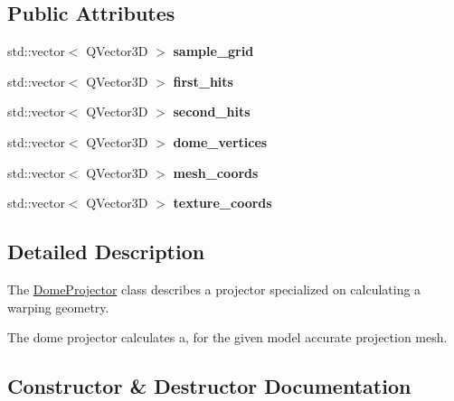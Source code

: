 \subsection*{Public Attributes}
\begin{DoxyCompactItemize}
\item 
\mbox{\label{class_dome_projector_aee69ea0cbe641217af998cbb6669d91a}} 
std\+::vector$<$ Q\+Vector3D $>$ {\bfseries sample\+\_\+grid}
\item 
\mbox{\label{class_dome_projector_a5d157d37386f714b94dd04455019749b}} 
std\+::vector$<$ Q\+Vector3D $>$ {\bfseries first\+\_\+hits}
\item 
\mbox{\label{class_dome_projector_aec6c5285b17e5c73537c45eb62bada81}} 
std\+::vector$<$ Q\+Vector3D $>$ {\bfseries second\+\_\+hits}
\item 
\mbox{\label{class_dome_projector_a65dad2376d52d0ec2601f4a797a3b4f2}} 
std\+::vector$<$ Q\+Vector3D $>$ {\bfseries dome\+\_\+vertices}
\item 
\mbox{\label{class_dome_projector_aa1540ea0ff8e2211b20176f04adb5455}} 
std\+::vector$<$ Q\+Vector3D $>$ {\bfseries mesh\+\_\+coords}
\item 
\mbox{\label{class_dome_projector_a28f75086f3ce94c35a3d6c7d102709db}} 
std\+::vector$<$ Q\+Vector3D $>$ {\bfseries texture\+\_\+coords}
\end{DoxyCompactItemize}


\subsection{Detailed Description}
The \mbox{\hyperlink{class_dome_projector}{Dome\+Projector}} class describes a projector specialized on calculating a warping geometry. 

The dome projector calculates a, for the given model accurate projection mesh. 

\subsection{Constructor \& Destructor Documentation}
\mbox{\label{class_dome_projector_aea4bdc99173b4fcc44388d5efb204ceb}} 
